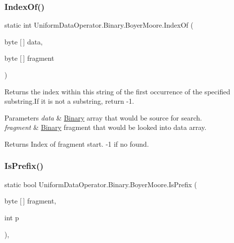 \subsubsection{\texorpdfstring{Index\+Of()}{IndexOf()}\hspace{0.1cm}{\footnotesize\ttfamily [2/2]}}
{\footnotesize\ttfamily static int Uniform\+Data\+Operator.\+Binary.\+Boyer\+Moore.\+Index\+Of (\begin{DoxyParamCaption}\item[{byte \mbox{[}$\,$\mbox{]}}]{data,  }\item[{byte \mbox{[}$\,$\mbox{]}}]{fragment }\end{DoxyParamCaption})\hspace{0.3cm}{\ttfamily [static]}}



Returns the index within this string of the first occurrence of the specified substring.\+If it is not a substring, return -\/1. 


\begin{DoxyParams}{Parameters}
{\em data} & \mbox{\hyperlink{namespace_uniform_data_operator_1_1_binary}{Binary}} array that would be source for search.\\
\hline
{\em fragment} & \mbox{\hyperlink{namespace_uniform_data_operator_1_1_binary}{Binary}} fragment that would be looked into data array.\\
\hline
\end{DoxyParams}
\begin{DoxyReturn}{Returns}
Index of fragment start. -\/1 if no found.
\end{DoxyReturn}
\mbox{\label{class_uniform_data_operator_1_1_binary_1_1_boyer_moore_ae65dcc0297e2910d1dd1c6efcc18f015}} 
\subsubsection{\texorpdfstring{Is\+Prefix()}{IsPrefix()}}
{\footnotesize\ttfamily static bool Uniform\+Data\+Operator.\+Binary.\+Boyer\+Moore.\+Is\+Prefix (\begin{DoxyParamCaption}\item[{byte \mbox{[}$\,$\mbox{]}}]{fragment,  }\item[{int}]{p }\end{DoxyParamCaption})\hspace{0.3cm}{\ttfamily [static]}, {\ttfamily [private]}}



